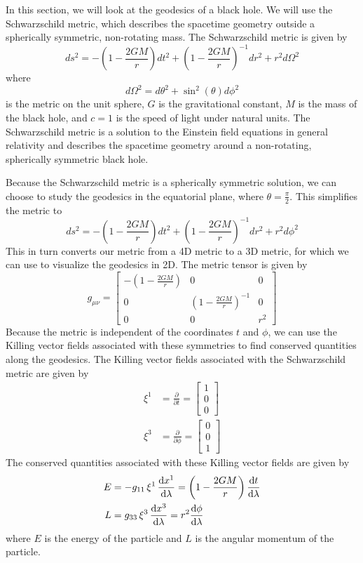 \documentclass[12pt]{article}
\begin{document}
In this section, we will look at the geodesics of a black hole.
We will use the Schwarzschild metric, which describes the spacetime geometry outside a spherically symmetric, non-rotating mass. The Schwarzschild metric is given by
\begin{equation}\label{eq:schwarzschild_metric}
	ds^2 = -\left(1 - \frac{2GM}{r}\right) dt^2 + \left(1 - \frac{2GM}{r}\right)^{-1} dr^2 + r^2 d\Omega^2
\end{equation}
where 
\[
d\Omega^2 = d\theta^2 + \sin^2(\theta) d\phi^2
\] 
is the metric on the unit sphere, \(G\) is the gravitational constant, \(M\) is the mass of the black hole, and \(c = 1\) is the speed of light under natural units.
The Schwarzschild metric is a solution to the Einstein field equations in general relativity and describes the spacetime geometry around a non-rotating, spherically symmetric black hole.

Because the Schwarzschild metric is a spherically symmetric solution, we can choose to study the geodesics in the equatorial plane, where \(\theta = \frac{\pi}{2}\).
This simplifies the metric to
\begin{equation}\label{eq:schwarzschild_metric_equatorial}
	ds^2 = -\left(1 - \frac{2GM}{r}\right) dt^2 + \left(1 - \frac{2GM}{r}\right)^{-1} dr^2 + r^2 d\phi^2
\end{equation}
This in turn converts our metric from a 4D metric to a 3D metric, for which we can use to visualize the geodesics in 2D.
The metric tensor is given by
\[
	g_{\mu\nu} = \begin{bmatrix}
	-\left(1 - \frac{2GM}{r}\right) & 0 & 0 \\
	0 & \left(1 - \frac{2GM}{r}\right)^{-1} & 0 \\
	0 & 0 & r^2
	\end{bmatrix}
\]
Because the metric is independent of the coordinates \(t\) and \(\phi\), we can use the Killing vector fields associated with these symmetries to find conserved quantities along the geodesics.
The Killing vector fields associated with the Schwarzschild metric are given by
\begin{align*}
	\xi^{1} &= \frac{\partial}{\partial t} = \begin{bmatrix} 1 \\ 0 \\ 0 \end{bmatrix} \\
	\xi^{3} &= \frac{\partial}{\partial \phi} = \begin{bmatrix} 0 \\ 0 \\ 1 \end{bmatrix}
\end{align*}
The conserved quantities associated with these Killing vector fields are given by
\begin{align}
	E &= -g_{11} \, \xi^{1} \, \dv{x^{1}}{\lambda} = \left(1 - \frac{2GM}{r}\right) \dv{t}{\lambda} \label{eq:energy} \\
	L &= g_{33} \, \xi^{3} \, \dv{x^{3}}{\lambda} = r^2 \dv{\phi}{\lambda} \label{eq:angular_momentum}
\end{align}
where \(E\) is the energy of the particle and \(L\) is the angular momentum of the particle.
\end{document}
